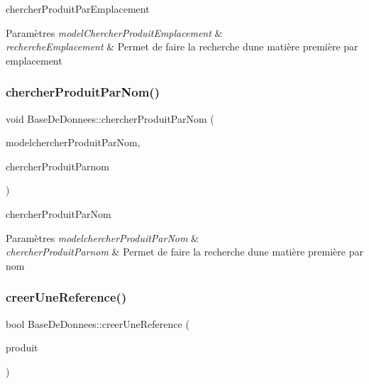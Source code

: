 chercher\+Produit\+Par\+Emplacement 


\begin{DoxyParams}{Paramètres}
{\em model\+Chercher\+Produit\+Emplacement} & \\
\hline
{\em recherche\+Emplacement} & Permet de faire la recherche d\textquotesingle{}une matière première par emplacement \\
\hline
\end{DoxyParams}
\mbox{\label{class_base_de_donnees_a49d9a59025c2342adc820849bffb5532}} 
\subsubsection{\texorpdfstring{chercher\+Produit\+Par\+Nom()}{chercherProduitParNom()}}
{\footnotesize\ttfamily void Base\+De\+Donnees\+::chercher\+Produit\+Par\+Nom (\begin{DoxyParamCaption}\item[{Q\+Sql\+Query\+Model $\ast$}]{modelchercher\+Produit\+Par\+Nom,  }\item[{Q\+String}]{chercher\+Produit\+Parnom }\end{DoxyParamCaption})}



chercher\+Produit\+Par\+Nom 


\begin{DoxyParams}{Paramètres}
{\em modelchercher\+Produit\+Par\+Nom} & \\
\hline
{\em chercher\+Produit\+Parnom} & Permet de faire la recherche d\textquotesingle{}une matière première par nom \\
\hline
\end{DoxyParams}
\mbox{\label{class_base_de_donnees_a48345312e89c6e8fdeec128f033566ee}} 
\subsubsection{\texorpdfstring{creer\+Une\+Reference()}{creerUneReference()}}
{\footnotesize\ttfamily bool Base\+De\+Donnees\+::creer\+Une\+Reference (\begin{DoxyParamCaption}\item[{\mbox{\hyperlink{class_produits}{Produits}} \&}]{produit }\end{DoxyParamCaption})}



